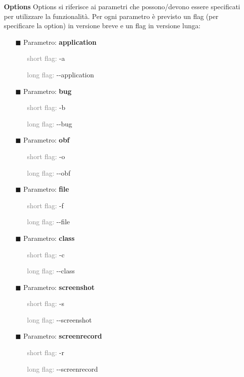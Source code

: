 \bigskip
\noindent\textbf{Options} \newline
Options si riferisce ai parametri che possono/devono essere specificati per utilizzare la funzionalità. Per ogni parametro è previsto un flag (per specificare la option) in versione breve e un flag in versione lunga:
\begin{itemize}[nosep]
\item [$\blacksquare$] Parametro: \textbf{application}
\begin{itemize}[nosep]
\item [] \textcolor{gray}{short flag:} -a
\item [] \textcolor{gray}{long flag:} -{}-application
\end{itemize}
\item [$\blacksquare$] Parametro: \textbf{bug}
\begin{itemize}[nosep]
\item [] \textcolor{gray}{short flag:} -b
\item [] \textcolor{gray}{long flag:} -{}-bug
\end{itemize}
\item [$\blacksquare$] Parametro: \textbf{obf}
\begin{itemize}[nosep]
\item [] \textcolor{gray}{short flag:} -o
\item [] \textcolor{gray}{long flag:} -{}-obf
\end{itemize}
\item [$\blacksquare$] Parametro: \textbf{file}
\begin{itemize}[nosep]
\item [] \textcolor{gray}{short flag:} -f
\item [] \textcolor{gray}{long flag:} -{}-file
\end{itemize}
\item [$\blacksquare$] Parametro: \textbf{class}
\begin{itemize}[nosep]
\item [] \textcolor{gray}{short flag:} -c
\item [] \textcolor{gray}{long flag:} -{}-class
\end{itemize}
\item [$\blacksquare$] Parametro: \textbf{screenshot}
\begin{itemize}[nosep]
\item [] \textcolor{gray}{short flag:} -s
\item [] \textcolor{gray}{long flag:} -{}-screenshot
\end{itemize}
\item [$\blacksquare$] Parametro: \textbf{screenrecord}
\begin{itemize}[nosep]
\item [] \textcolor{gray}{short flag:} -r
\item [] \textcolor{gray}{long flag:} -{}-screenrecord
\end{itemize}
\end{itemize}

